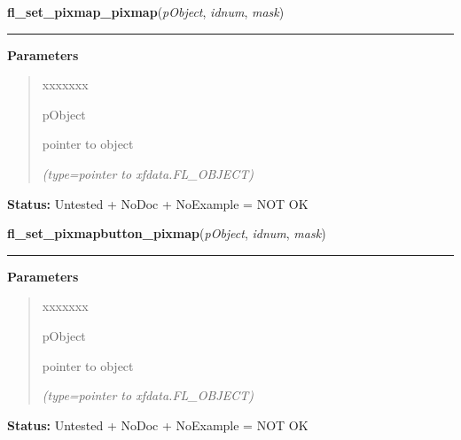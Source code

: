\hspace{.8\funcindent}\begin{boxedminipage}{\funcwidth}

    \raggedright \textbf{fl\_set\_pixmap\_pixmap}(\textit{pObject}, \textit{idnum}, \textit{mask})

    \vspace{-1.5ex}

    \rule{\textwidth}{0.5\fboxrule}
\setlength{\parskip}{2ex}
\setlength{\parskip}{1ex}
      \textbf{Parameters}
      \vspace{-1ex}

      \begin{quote}
        \begin{Ventry}{xxxxxxx}

          \item[pObject]

          pointer to object

            {\it (type=pointer to xfdata.FL\_OBJECT)}

        \end{Ventry}

      \end{quote}

\textbf{Status:} Untested + NoDoc + NoExample = NOT OK



    \end{boxedminipage}

    \label{xformslib:library:fl_set_pixmap_pixmap}

    \vspace{0.5ex}

\hspace{.8\funcindent}\begin{boxedminipage}{\funcwidth}

    \raggedright \textbf{fl\_set\_pixmapbutton\_pixmap}(\textit{pObject}, \textit{idnum}, \textit{mask})

    \vspace{-1.5ex}

    \rule{\textwidth}{0.5\fboxrule}
\setlength{\parskip}{2ex}
\setlength{\parskip}{1ex}
      \textbf{Parameters}
      \vspace{-1ex}

      \begin{quote}
        \begin{Ventry}{xxxxxxx}

          \item[pObject]

          pointer to object

            {\it (type=pointer to xfdata.FL\_OBJECT)}

        \end{Ventry}

      \end{quote}

\textbf{Status:} Untested + NoDoc + NoExample = NOT OK



    \end{boxedminipage}

